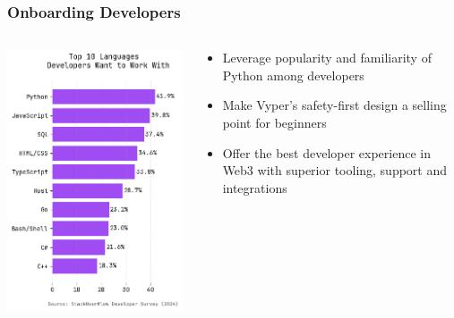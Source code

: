 \documentclass[aspectratio=169]{beamer}
\begin{document}
	\begin{frame}
		\frametitle{Onboarding Developers}
		\begin{columns}[T,totalwidth=\textwidth]
			\begin{column}{0.35\textwidth}
				\vspace{2em} %
				\includegraphics[width=\columnwidth,height=0.75\paperheight,keepaspectratio]{charts/top10.png}
			\end{column}
			\begin{column}{0.65\textwidth}
				\vspace{2em} %
				\begin{itemize}
					\item Leverage popularity and familiarity of Python among developers
					\vspace{0.7em}
					\item Make Vyper's safety-first design a selling point for beginners
					\vspace{0.7em}
					\item Offer the best developer experience in Web3 with superior tooling, support and integrations
				\end{itemize}
			\end{column}
		\end{columns}
	\end{frame}
\end{document}
